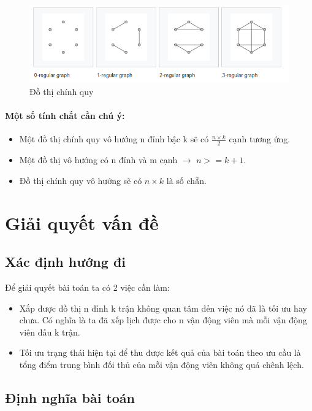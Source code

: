 \documentclass[13pt,a4paper]{article}
\begin{document}
\begin{figure}[H]
	\begin{center}
	\includegraphics[scale=0.7]{./image/regular_graph.png}
	\caption{Đồ thị chính quy}
	\end{center}
\end{figure}

\paragraph{Một số tính chất cần chú ý:}
\begin{itemize}
	\item Một đồ thị chính quy vô hướng n đỉnh bậc k sẽ có $\frac{n \times k}{2}$ cạnh tương ứng.
	\item Một đồ thị vô hướng có n đỉnh và m cạnh $\rightarrow$ $ n >= k+1$.
	\item Đồ thị chính quy vô hướng sẽ có $n \times k $ là số chẵn.
\end{itemize}

\section{Giải quyết vấn đề}
\subsection{Xác định hướng đi}
Để giải quyết bài toán ta có 2 việc cần làm:
\begin{itemize}
	\item Xắp được đồ thị n đỉnh k trận không quan tâm đến việc nó đã là tối ưu hay chưa. Có nghĩa là ta đã xếp lịch được cho n vận động viên mà mỗi vận động viên đấu k trận.
	\item Tối ưu trạng thái hiện tại để thu được kết quả của bài toán theo ưu cầu là tổng điểm trung bình đối thủ của mỗi vận động viên không quá chênh lệch.
\end{itemize}

\subsection{Định nghĩa bài toán}
\end{document}
